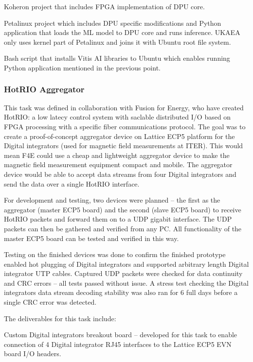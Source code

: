 \documentclass[preprint]{elsarticle}
\begin{document}
Koheron project that includes FPGA implementation of DPU core. 

Petalinux project which includes DPU specific modifications and Python application that loads the ML model to DPU core and runs inference. UKAEA only uses kernel part of Petalinux and joins it with Ubuntu root file system.  

Bash script that installs Vitis AI libraries to Ubuntu which enables running Python application mentioned in the previous point.  

\subsubsection{HotRIO Aggregator}

This task was defined in collaboration with Fusion for Energy, who have created HotRIO: a low latecy control system with saclable distributed I/O 
based on FPGA processing with a specific fiber communications protocol.
The goal was to create a proof-of-concept aggregator device on Lattice ECP5 platform for the Digital integrators (used for magnetic field measurements at ITER). This would mean F4E could use a cheap and lightweight aggregator device to make the magnetic field measurement equipment compact and mobile. The aggregator device would be able to accept data streams from four Digital integrators and send the data over a single HotRIO interface. 

For development and testing, two devices were planned – the first as the aggregator (master ECP5 board) and the second (slave ECP5 board) to receive HotRIO packets and forward them on to a UDP gigabit interface. The UDP packets can then be gathered and verified from any PC. All functionality of the master ECP5 board can be tested and verified in this way. 

Testing on the finished devices was done to confirm the finished prototype enabled hot plugging of Digital integrators and supported arbitrary length Digital integrator UTP cables. Captured UDP packets were checked for data continuity and CRC errors – all tests passed without issue. A stress test checking the Digital integrators data stream decoding stability was also ran for 6 full days before a single CRC error was detected.  

The deliverables for this task include: 

Custom Digital integrators breakout board – developed for this task to enable connection of 4 Digital integrator RJ45 interfaces to the Lattice ECP5 EVN board I/O headers. 
\end{document}
